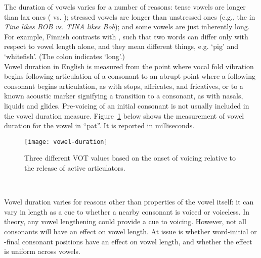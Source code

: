 \documentclass[lab={3},title={Vowel Lengthening}]{com310lab}
\begin{document}
\maketitle

\begin{overview}
	The duration of vowels varies for a number of reasons: tense vowels are longer than lax ones ( vs. ); stressed vowels are longer than unstressed ones (e.g., the  in \textit{Tina likes BOB vs. TINA likes Bob}); and some vowels are just inherently long.
	For example, Finnish contrasts  with , such that two words can differ only with respect to vowel length alone, and they mean different things, e.g.  `pig' and  `whitefish'.
	(The colon indicates `long'.)\\

	Vowel duration in English is measured from the point where vocal fold vibration begins following articulation of a consonant to an abrupt point where a following consonant begins articulation, as with stops, affricates, and fricatives, or to a known acoustic marker signifying a transition to a consonant, as with nasals, liquids and glides.
	Pre-voicing of an initial consonant is not usually included in the vowel duration measure.
	Figure~\ref{fig:vowel-duration} below shows the measurement of vowel duration for the vowel in ``pat''.
	It is reported in milliseconds.

	\begin{figure}[H]
		\centering
		\texttt{[image: vowel-duration]}
		\caption{Three different VOT values based on the onset of voicing relative to the release of active articulators.}
		\label{fig:vowel-duration}
	\end{figure}~
\end{overview}

\begin{problem}
	Vowel duration varies for reasons other than properties of the vowel itself:
	it can vary in length as a cue to whether a nearby consonant is voiced or voiceless.
	In theory, any vowel lengthening could provide a cue to voicing.
	However, not all consonants will have an effect on vowel length.
	At issue is whether word-initial or -final consonant positions have an effect on vowel length, and whether the effect is uniform across vowels.
\end{problem}
\end{document}
